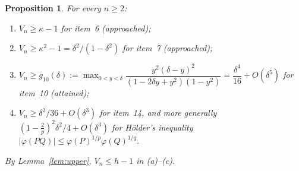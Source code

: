 \documentclass[11pt]{article}
\theoremstyle{plain}
\newtheorem{proposition}[theorem]{Proposition}
\theoremstyle{definition}
\theoremstyle{remark}
\begin{document}
\begin{proposition}\label{prop:lower}
For every $n\ge2$:
\begin{enumerate}
\item[(a)] $V_n\ge\kappa-1$ for item~6 (approached);
\item[(b)] $V_n\ge\kappa^2-1=\delta^2/(1-\delta^2)$ for item~7 (approached);
\item[(c)] $V_n\ge g_{10}(\delta):=\max_{0<y<\delta}\dfrac{y^2(\delta-y)^2}{(1-2\delta y+y^2)(1-y^2)}=\dfrac{\delta^4}{16}+O(\delta^5)$
for item~10 (attained);
\item[(d)] $V_n\ge\delta^2/36+O(\delta^3)$ for item~14, and more generally
$(1-\frac2p)^2\delta^2/4+O(\delta^3)$ for Hölder's inequality $|\varphi(PQ)|\le\varphi(P)^{1/p}\varphi(Q)^{1/q}$.
\end{enumerate}
By Lemma~\ref{lem:upper}, $V_n\le h-1$ in (a)--(c).
\end{proposition}
\end{document}
